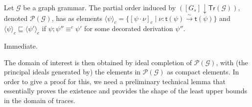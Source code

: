 \documentclass[conference]{IEEEtran}
\renewenvironment{proof}{\begin{IEEEproof}}{\end{IEEEproof}}
\newcommand{\full}[1]{}
\newcommand{\full}[1]{{#1}}
\newcommand{\slice}[2]{\ensuremath{({#1} \downarrow {#2})}}
\newcommand{\poset}[1]{\ensuremath{\mathcal{P}({#1})}}
\newcommand{\tr}[1]{\ensuremath{\mathsf{Tr}({#1})}}
\newcommand{\target}[1]{\ensuremath{\mathsf{t}({#1})}}
\newcommand{\ltrace}[1]{\ensuremath{\langle {#1}\rangle_c}}
\begin{document}
\begin{lemma}
\label{le:partial_order_gg}
  Let $\mathcal{G}$ be a graph grammar. The partial order induced by
  $\slice{[G_s]}{\tr{\mathcal{G}}}$, denoted $\poset{\mathcal{G}}$,
  has as elements
  $\ltrace{\psi} = \{ [\psi \cdot \nu]_c \mid \nu : \target{\psi}
  \stackrel{\sim}{\to} \target{\psi} \}$ and
  $\ltrace{\psi} \sqsubseteq \ltrace{\psi'}$ if
  $\psi;\psi'' \equiv^c \psi'$ for some decorated derivation $\psi''$.
%
%  
\end{lemma}

\begin{proof}
  Immediate.
\end{proof}



The domain of interest is then obtained by ideal completion of
$\poset{\mathcal{G}}$, with (the principal ideals generated by) the elements in
$\poset{\mathcal{G}}$ as compact elements.
%
In order to give a proof for this, we need a preliminary technical lemma that
essentially proves the existence and provides the shape of the least 
upper bounds in the domain of traces.
\end{document}
